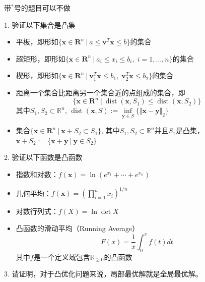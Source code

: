 \begin{frame}

{\color{red} \scriptsize 带$^*$号的题目可以不做}

\vspace{1em}

1. 验证以下集合是凸集
\begin{itemize}
\item[(1)] 平板，即形如$\{\mathbf{x} \in \mathbf{R}^n \ |\ a \le \mathbf{v}^T\mathbf{x} \le b \}$的集合
\item[(2)] 超矩形，即形如$\{\mathbf{x} \in \mathbf{R}^n \ |\ a_i \le x_i \le b_i, \; i=1,\ldots,n \}$的集合
\item[(3)] 楔形，即形如$\{\mathbf{x} \in \mathbf{R}^n \ |\ \mathbf{v}_1^T\mathbf{x} \le b_1, \; \mathbf{v}_2^T\mathbf{x} \le b_2 \}$的集合
\item[(4)] 距离一个集合比距离另一个集合近的点组成的集合，即
\[\{\mathbf{x} \in \mathbf{R}^n \ |\ \operatorname{dist}(\mathbf{x}, S_1) \le \operatorname{dist}(\mathbf{x}, S_2) \}\]
其中$S_1,S_2 \subset \mathbb{R}^n$, $\operatorname{dist}(\mathbf{x}, S) := \inf\limits_{\mathbf{y} \in S} \{ \Vert \mathbf{x} - \mathbf{y} \Vert_2 \}$
\item[(5)] 集合$\{\mathbf{x} \in \mathbf{R}^n \ |\ \mathbf{x} + S_2 \subset S_1 \}$, 其中$S_1,S_2 \subset \mathbb{R}^n$并且$S_1$是凸集，$\mathbf{x} + S_2 := \{ \mathbf{x} + \mathbf{y} \ |\ \mathbf{y} \in S_2 \}$
\end{itemize}

\end{frame}


\begin{frame}

2. 验证以下函数是凸函数
\begin{itemize}
\item[(1)] 指数和对数：$f(\mathbf{x}) = \ln(e^{x_1} + \cdots + e^{x_n})$
\item[(2)] 几何平均：$f(\mathbf{x}) = \left( \prod\limits_{i=1}^n x_i \right)^{1/n}$
\item[(3)] 对数行列式：$f(X) = \ln\det X$
\item[(4)] 凸函数的滑动平均（Running Average）
\[F(x) = \dfrac{1}{x}\int_0^{x} f(t) dt\]
其中$f$是一个定义域包含$\mathbb{R}_{\ge 0}$的凸函数
\end{itemize}

\vspace{1em}

3. 请证明，对于凸优化问题来说，局部最优解就是全局最优解。

\end{frame}

